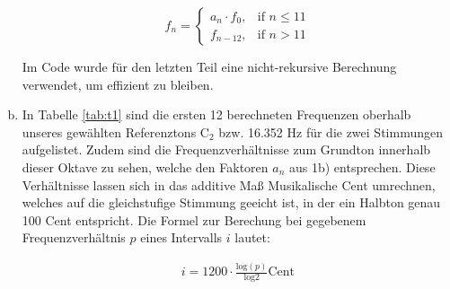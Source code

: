\begin{enumerate}[a)]
\[
    f_n = 
\begin{cases}
    a_n \cdot f_0,& \text{if } n\leq 11 \\
    f_{n-12},&\text{if } n> 11
\end{cases}  
\]

Im Code wurde für den letzten Teil eine nicht-rekursive Berechnung verwendet, um effizient zu bleiben.

\item

In Tabelle \ref{tab:t1} sind die ersten 12 berechneten Frequenzen oberhalb unseres gewählten Referenztons C$_{2}$ bzw. 16.352 Hz für die zwei Stimmungen aufgelistet. Zudem sind die Frequenzverhältnisse zum Grundton innerhalb dieser Oktave zu sehen, welche den Faktoren $a_n$ aus 1b) entsprechen. Diese Verhältnisse lassen sich in das additive Maß \glqq Musikalische Cent \grqq umrechnen, welches auf die gleichstufige Stimmung geeicht ist, in der ein Halbton genau 100 Cent entspricht. Die Formel zur Berechung bei gegebenem Frequenzverhältnis $p$ eines Intervalls $i$ lautet:

\begin{align*}
    i = 1200 \cdot \frac{\mathrm{log}(p)}{\mathrm{log} 2} \mathrm{Cent}
\end{align*}





\end{enumerate}
